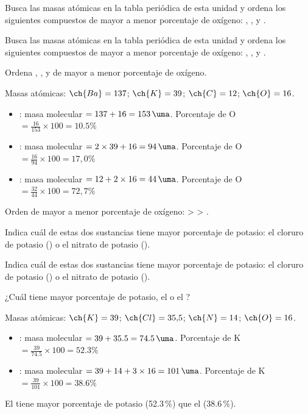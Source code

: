 \begin{exercise}
    Busca las masas atómicas en la tabla periódica de esta unidad y ordena los siguientes compuestos de mayor a menor porcentaje de oxígeno: , , y .
    \begin{solu}
        Busca las masas atómicas en la tabla periódica de esta unidad y ordena los siguientes compuestos de mayor a menor porcentaje de oxígeno: , , y .

        Ordena , , y  de mayor a menor porcentaje de oxígeno.

        Masas atómicas: \( \ch{Ba} = 137 \); \( \ch{K} = 39 \); \( \ch{C} = 12 \); \( \ch{O} = 16 \).

        \begin{itemize}
            \item {}: masa molecular \( = 137 + 16 = \qty{153}{\uma} \). Porcentaje de O \( = \frac{16}{153} \times 100 = 10.5 \% \)
            \item {}: masa molecular \( = 2 \times 39 + 16 = \qty{94}{\uma} \). Porcentaje de O \( = \frac{16}{94} \times 100 = 17{,}0\% \)
            \item {}: masa molecular \( = 12 + 2 \times 16 = \qty{44}{\uma} \). Porcentaje de O \( = \frac{32}{44} \times 100 = 72{,}7\% \)
        \end{itemize}

        Orden de mayor a menor porcentaje de oxígeno:  >  > .
    \end{solu}
\end{exercise}


\begin{exercise}
    Indica cuál de estas dos sustancias tiene mayor porcentaje de potasio: el cloruro de potasio () o el nitrato de potasio ().
    \begin{solu}
        Indica cuál de estas dos sustancias tiene mayor porcentaje de potasio: el cloruro de potasio () o el nitrato de potasio ().

        ¿Cuál tiene mayor porcentaje de potasio, el  o el ?

        Masas atómicas: \( \ch{K} = 39 \); \( \ch{Cl} = 35{,}5 \); \( \ch{N} = 14 \); \( \ch{O} = 16 \).

        \begin{itemize}
            \item {}: masa molecular \( = 39 + \num{35.5} = \qty{74.5}{\uma} \). Porcentaje de K \( = \frac{39}{74.5} \times 100 = 52.3\% \)
            \item {}: masa molecular \( = 39 + 14 + 3 \times 16 = \qty{101}{\uma} \). Porcentaje de K \( = \frac{39}{101} \times 100 = 38.6\% \)
        \end{itemize}

        El  tiene mayor porcentaje de potasio (52.3\,\%) que el  (38.6\,\%).
    \end{solu}
\end{exercise}


